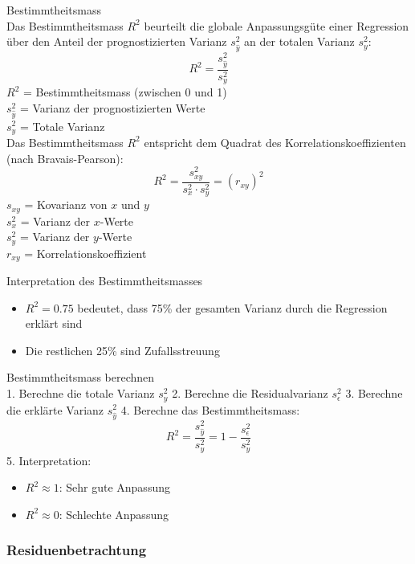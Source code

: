 \begin{theorem}{Bestimmtheitsmass}\\
Das Bestimmtheitsmass $R^2$ beurteilt die globale Anpassungsgüte einer Regression über den Anteil der prognostizierten Varianz $s_{\hat{y}}^2$ an der totalen Varianz $s_y^2$:
$$
R^2=\frac{s_{\hat{y}}^2}{s_y^2}
$$
$R^2$ = Bestimmtheitsmass (zwischen 0 und 1)\\
$s_{\hat{y}}^2$ = Varianz der prognostizierten Werte\\
$s_y^2$ = Totale Varianz\\

Das Bestimmtheitsmass $R^2$ entspricht dem Quadrat des Korrelationskoeffizienten (nach Bravais-Pearson):
$$
R^2=\frac{s_{xy}^2}{s_x^2 \cdot s_y^2}=(r_{xy})^2
$$
$s_{xy}$ = Kovarianz von $x$ und $y$\\
$s_x^2$ = Varianz der $x$-Werte\\
$s_y^2$ = Varianz der $y$-Werte\\
$r_{xy}$ = Korrelationskoeffizient\\
\end{theorem}

\begin{corollary}{Interpretation des Bestimmtheitsmasses}
\begin{itemize}
  \item $R^2 = 0.75$ bedeutet, dass 75\% der gesamten Varianz durch die Regression erklärt sind
  \item Die restlichen 25\% sind Zufallsstreuung
\end{itemize}
\end{corollary}

\begin{KR}{Bestimmtheitsmass berechnen}\\
1. Berechne die totale Varianz $s_y^2$
2. Berechne die Residualvarianz $s_{\epsilon}^2$
3. Berechne die erklärte Varianz $s_{\hat{y}}^2$
4. Berechne das Bestimmtheitsmass:
   $$R^2 = \frac{s_{\hat{y}}^2}{s_y^2} = 1 - \frac{s_{\epsilon}^2}{s_y^2}$$
5. Interpretation:
   \begin{itemize}
     \item $R^2 \approx 1$: Sehr gute Anpassung
     \item $R^2 \approx 0$: Schlechte Anpassung
   \end{itemize}
\end{KR}

\subsubsection{Residuenbetrachtung}

